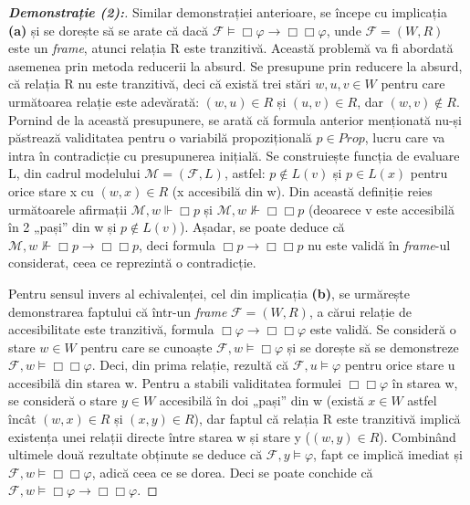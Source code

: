 \documentclass[12pt, openany]{book}
\begin{document}
            \begin{proof}[\textbf{Demonstrație (2):}]
                Similar demonstrației anterioare, se începe cu implicația \textbf{(a)} și se dorește să se arate că dacă 
                $\mathcal{F} \vDash \Box \varphi \rightarrow \Box \Box \varphi$, unde $\mathcal{F}=(W,R)$ este un 
                \textit{frame}, atunci relația R este tranzitivă. Această problemă va fi abordată asemenea prin metoda reducerii 
                la absurd. Se presupune prin reducere la absurd, că relația R nu este tranzitivă, deci că există trei stări
                $w,u,v \in W$ pentru care următoarea relație este adevărată: $(w,u) \in R$ și $(u,v) \in R$, dar $(w,v) 
                \notin R$. Pornind de la această presupunere, se arată că formula anterior menționată nu-și păstrează 
                validitatea pentru o variabilă propozițională $p \in Prop$, lucru care va intra în contradicție cu 
                presupunerea inițială. Se construiește funcția de evaluare L, din cadrul modelului $\mathcal{M}=
                (\mathcal{F},L)$, astfel: $p \notin L(v)$ și $p \in L(x)$ pentru orice stare x cu $(w,x) \in R$ (x 
                accesibilă din w). Din această definiție reies următoarele afirmații $\mathcal{M},w \Vdash \Box p$ și 
                $\mathcal{M},w \nVdash \Box \Box p$ (deoarece v este accesibilă în 2 „pași” din w și $p \notin L(v)$). 
                Așadar, se poate deduce că $\mathcal{M},w \nVdash \Box p \rightarrow \Box \Box p$, deci formula $\Box p 
                \rightarrow \Box \Box p$ nu este validă în \textit{frame}-ul considerat, ceea ce reprezintă o contradicție.

                Pentru sensul invers al echivalenței, cel din implicația \textbf{(b)}, se urmărește demonstrarea faptului că
                într-un \textit{frame} $\mathcal{F}=(W,R)$, a cărui relație de accesibilitate este tranzitivă, formula 
                $\Box \varphi \rightarrow \Box \Box \varphi$ este validă. Se consideră o stare $w \in W$ pentru care se 
                cunoaște $\mathcal{F},w \vDash \Box \varphi$ și se dorește să se demonstreze $\mathcal{F},w \vDash \Box \Box 
                \varphi$. Deci, din prima relație, rezultă că $\mathcal{F},u \vDash \varphi$ pentru orice stare u accesibilă
                din starea w. Pentru a stabili validitatea formulei $\Box \Box \varphi$ în starea w, se consideră o stare $y
                \in W$ accesibilă în doi „pași” din w (există $x \in W$ astfel încât $(w,x) \in R$ și $(x,y) \in R$), dar 
                faptul că relația R este tranzitivă implică existența unei relații directe între starea w și stare y ($(w,y)
                \in R$). Combinând ultimele două rezultate obținute se deduce că $\mathcal{F},y \vDash \varphi$, fapt ce 
                implică imediat și $\mathcal{F},w \vDash \Box \Box \varphi$, adică ceea ce se dorea. Deci se poate conchide că 
                $\mathcal{F},w \vDash \Box \varphi \rightarrow \Box \Box \varphi$.
            \end{proof}
\end{document}
